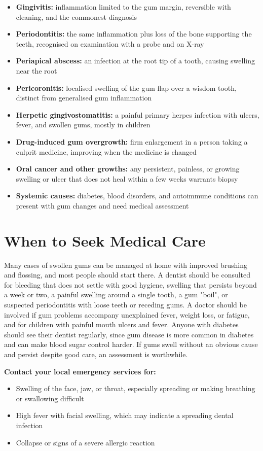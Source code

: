\begin{itemize}
    \item \textbf{Gingivitis:} inflammation limited to the gum margin, reversible with cleaning, and the commonest diagnosis
    \item \textbf{Periodontitis:} the same inflammation plus loss of the bone supporting the teeth, recognised on examination with a probe and on X-ray
    \item \textbf{Periapical abscess:} an infection at the root tip of a tooth, causing swelling near the root
    \item \textbf{Pericoronitis:} localised swelling of the gum flap over a wisdom tooth, distinct from generalised gum inflammation
    \item \textbf{Herpetic gingivostomatitis:} a painful primary herpes infection with ulcers, fever, and swollen gums, mostly in children
    \item \textbf{Drug-induced gum overgrowth:} firm enlargement in a person taking a culprit medicine, improving when the medicine is changed
    \item \textbf{Oral cancer and other growths:} any persistent, painless, or growing swelling or ulcer that does not heal within a few weeks warrants biopsy
    \item \textbf{Systemic causes:} diabetes, blood disorders, and autoimmune conditions can present with gum changes and need medical assessment
\end{itemize}

\section*{When to Seek Medical Care}
Many cases of swollen gums can be managed at home with improved brushing and flossing, and most people should start there. A dentist should be consulted for bleeding that does not settle with good hygiene, swelling that persists beyond a week or two, a painful swelling around a single tooth, a gum "boil", or suspected periodontitis with loose teeth or receding gums. A doctor should be involved if gum problems accompany unexplained fever, weight loss, or fatigue, and for children with painful mouth ulcers and fever. Anyone with diabetes should see their dentist regularly, since gum disease is more common in diabetes and can make blood sugar control harder. If gums swell without an obvious cause and persist despite good care, an assessment is worthwhile.

\textbf{Contact your local emergency services for:}
\begin{itemize}
    \item Swelling of the face, jaw, or throat, especially spreading or making breathing or swallowing difficult
    \item High fever with facial swelling, which may indicate a spreading dental infection
    \item Collapse or signs of a severe allergic reaction
\end{itemize}

